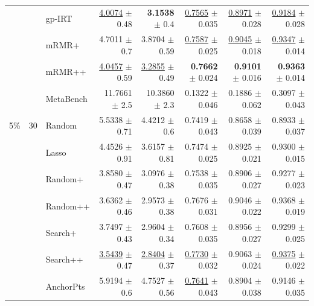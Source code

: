 \begin{longtable}{llp{}rrrrr}
 &  & gp-IRT & \underline{4.0074} {\scriptsize $\pm$ 0.48} & \textbf{3.1538} {\scriptsize $\pm$ 0.4} & \underline{0.7565} {\scriptsize $\pm$ 0.035} & \underline{0.8971} {\scriptsize $\pm$ 0.028} & \underline{0.9184} {\scriptsize $\pm$ 0.028} \\
 &  & mRMR+ & 4.7011 {\scriptsize $\pm$ 0.7} & 3.8704 {\scriptsize $\pm$ 0.59} & \underline{0.7587} {\scriptsize $\pm$ 0.025} & \underline{0.9045} {\scriptsize $\pm$ 0.018} & \underline{0.9347} {\scriptsize $\pm$ 0.014} \\
 &  & mRMR++ & \underline{4.0457} {\scriptsize $\pm$ 0.59} & \underline{3.2855} {\scriptsize $\pm$ 0.49} & \textbf{0.7662} {\scriptsize $\pm$ 0.024} & \textbf{0.9101} {\scriptsize $\pm$ 0.016} & \textbf{0.9363} {\scriptsize $\pm$ 0.014} \\
 &  & MetaBench & 11.7661 {\scriptsize $\pm$ 2.5} & 10.3860 {\scriptsize $\pm$ 2.3} & 0.1322 {\scriptsize $\pm$ 0.046} & 0.1886 {\scriptsize $\pm$ 0.062} & 0.3097 {\scriptsize $\pm$ 0.043} \\
\midrule
5\% & 30 & Random & 5.5338 {\scriptsize $\pm$ 0.71} & 4.4212 {\scriptsize $\pm$ 0.6} & 0.7419 {\scriptsize $\pm$ 0.043} & 0.8658 {\scriptsize $\pm$ 0.039} & 0.8933 {\scriptsize $\pm$ 0.037} \\
 &  & Lasso & 4.4526 {\scriptsize $\pm$ 0.91} & 3.6157 {\scriptsize $\pm$ 0.81} & 0.7474 {\scriptsize $\pm$ 0.025} & 0.8925 {\scriptsize $\pm$ 0.021} & 0.9300 {\scriptsize $\pm$ 0.015} \\
 &  & Random+ & 3.8580 {\scriptsize $\pm$ 0.47} & 3.0976 {\scriptsize $\pm$ 0.38} & 0.7538 {\scriptsize $\pm$ 0.035} & 0.8906 {\scriptsize $\pm$ 0.027} & 0.9277 {\scriptsize $\pm$ 0.023} \\
 &  & Random++ & 3.6362 {\scriptsize $\pm$ 0.46} & 2.9573 {\scriptsize $\pm$ 0.38} & 0.7676 {\scriptsize $\pm$ 0.031} & 0.9046 {\scriptsize $\pm$ 0.022} & 0.9368 {\scriptsize $\pm$ 0.019} \\
 &  & Search+ & 3.7497 {\scriptsize $\pm$ 0.43} & 2.9604 {\scriptsize $\pm$ 0.34} & 0.7608 {\scriptsize $\pm$ 0.035} & 0.8956 {\scriptsize $\pm$ 0.027} & 0.9299 {\scriptsize $\pm$ 0.025} \\
 &  & Search++ & \underline{3.5439} {\scriptsize $\pm$ 0.47} & \underline{2.8404} {\scriptsize $\pm$ 0.37} & \underline{0.7730} {\scriptsize $\pm$ 0.032} & 0.9063 {\scriptsize $\pm$ 0.024} & \underline{0.9375} {\scriptsize $\pm$ 0.022} \\
 &  & AnchorPts & 5.9194 {\scriptsize $\pm$ 0.6} & 4.7527 {\scriptsize $\pm$ 0.56} & \underline{0.7641} {\scriptsize $\pm$ 0.043} & 0.8904 {\scriptsize $\pm$ 0.038} & 0.9146 {\scriptsize $\pm$ 0.035} \\

\end{longtable}
